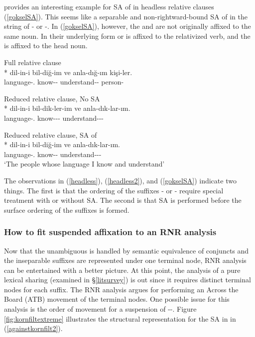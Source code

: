 \cite{goksel2005morphology} provides an interesting example for SA of {\Pl} in headless relative clauses (\ref{gokselSA}). This seems like a separable and non-rightward-bound SA of {\Pl} in the string of {\Pl-\Poss} or {\Pl-\Agr}. In (\ref{gokselSA}), however, the {\Pl} and {\Poss} are not originally affixed to the same noun. In their underlying form {\Poss} or {\Agr} is affixed to the relativized verb, and the {\Pl} is affixed to the head noun.


\begin{exe}
    \ex \label{gokselSA}
    \begin{xlist}
    \ex Full relative clause\\*
    \gll dil-in-i bil-diğ-im ve anla-dığ-ım kişi-ler. \\
    language-{\Poss.\Spl} know-{\Pp}-{\Fsg} {\And} understand-{\Pp}-{\Fsg} person-{\Pl} \\
    \glt ${}$
    
    \ex Reduced relative clause, No SA \\*
    \gll dil-in-i bil-dik-ler-im ve anla-dık-lar-ım. \\
    language-{\Poss.\Spl} know-{\Pp}-{\Pl}-{\Fsg} {\And} understand-{\Pp}-{\Pl}-{\Fsg} \\
    \glt ${}$
    
    \ex Reduced relative clause, SA of {\Pl}\\*
    \gll dil-in-i bil-diğ-im ve anla-dık-lar-ım. \\
    language-{\Poss.\Spl} know-{\Pp}-{\Fsg} {\And} understand-{\Pp}-{\Pl}-{\Fsg} \\
    \glt `The people whose language I know and understand'
    \end{xlist}
\end{exe}

The observations in (\ref{headless}), (\ref{headless2}), and (\ref{gokselSA}) indicate two things. The first is that the ordering of the suffixes {\Pl-\Poss} or {\Pl-\Agr} require special treatment with or without SA. The second is that SA is performed before the surface ordering of the suffixes is formed.

\subsubsection{How to fit suspended affixation to an RNR analysis}

Now that the unambiguous {\Case} is handled by semantic equivalence of conjuncts and the inseparable suffixes are represented under one terminal node, RNR analysis can be entertained with a better picture. At this point, the analysis of a pure lexical sharing \citep{broadwell2008turkish} (examined in \S\ref{litsurvey}) is out since it requires distinct terminal nodes for each suffix. The RNR analysis argues for performing an Across the Board (ATB) movement of the terminal nodes. One possible issue for this analysis is the order of movement for a suspension of {\Pl-\Poss-\Case}. Figure \ref{fig:kornfiltextreme} illustrates the structural representation for the SA in in (\ref{againstkornfilt2}).

